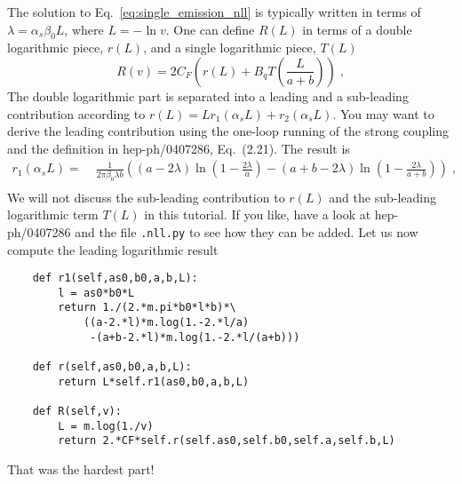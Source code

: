 \documentclass[10pt,fleqn]{scrartcl}
\begin{document}
The solution to Eq.~\eqref{eq:single_emission_nll} is typically written in terms of
$\lambda=\alpha_s\beta_0 L$, where $L=-\ln v$. One can define $R(L)$ in terms 
of a double logarithmic piece, $r(L)$, and a single logarithmic piece, $T(L)$
\begin{equation}\label{eq:R_caesar}
  R(v) = 2C_F\left(r(L)+B_qT\left(\frac{L}{a+b}\right)\right)\;,
\end{equation}
The double logarithmic part is separated into a leading and a sub-leading
contribution according to $r(L)=L r_1(\alpha_sL)+r_2(\alpha_sL)$.
You may want to derive the leading contribution using the one-loop running
of the strong coupling and the definition in hep-ph/0407286, Eq.~(2.21).
The result is
\begin{equation}\label{eq:r1_caesar}
  \begin{split}
    r_1(\alpha_sL) =&\; \frac{1}{2\pi\beta_0\lambda b}
    \left((a-2\lambda)\ln\left(1-\frac{2\lambda}{a}\right)
    -(a+b-2\lambda)\ln\left(1-\frac{2\lambda}{a+b}\right)\right)\;,\\
  \end{split}
\end{equation}
We will not discuss the sub-leading contribution to $r(L)$ and the sub-leading
logarithmic term $T(L)$ in this tutorial. If you like, have a look at hep-ph/0407286
and the file {\tt .nll.py} to see how they can be added. Let us now compute 
the leading logarithmic result
\begin{verbatim}
    def r1(self,as0,b0,a,b,L):
        l = as0*b0*L
        return 1./(2.*m.pi*b0*l*b)*\
            ((a-2.*l)*m.log(1.-2.*l/a)
             -(a+b-2.*l)*m.log(1.-2.*l/(a+b)))
        
    def r(self,as0,b0,a,b,L):
        return L*self.r1(as0,b0,a,b,L)

    def R(self,v):
        L = m.log(1./v)
        return 2.*CF*self.r(self.as0,self.b0,self.a,self.b,L)
\end{verbatim}
That was the hardest part!
\end{document}

